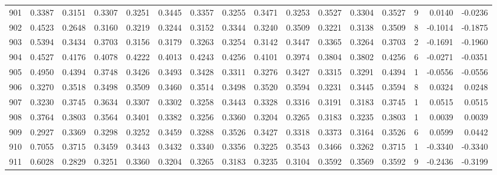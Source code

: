 \begin{tabular}{lrrrrrrrrrrrrrrr}
901 &      0.3387 &  0.3151 &  0.3307 &  0.3251 &  0.3445 &  0.3357 &  0.3255 &  0.3471 &  0.3253 &  0.3527 &   0.3304 &     0.3527 &      9 &                    0.0140 &                    -0.0236 \\
902 &      0.4523 &  0.2648 &  0.3160 &  0.3219 &  0.3244 &  0.3152 &  0.3344 &  0.3240 &  0.3509 &  0.3221 &   0.3138 &     0.3509 &      8 &                   -0.1014 &                    -0.1875 \\
903 &      0.5394 &  0.3434 &  0.3703 &  0.3156 &  0.3179 &  0.3263 &  0.3254 &  0.3142 &  0.3447 &  0.3365 &   0.3264 &     0.3703 &      2 &                   -0.1691 &                    -0.1960 \\
904 &      0.4527 &  0.4176 &  0.4078 &  0.4222 &  0.4013 &  0.4243 &  0.4256 &  0.4101 &  0.3974 &  0.3804 &   0.3802 &     0.4256 &      6 &                   -0.0271 &                    -0.0351 \\
905 &      0.4950 &  0.4394 &  0.3748 &  0.3426 &  0.3493 &  0.3428 &  0.3311 &  0.3276 &  0.3427 &  0.3315 &   0.3291 &     0.4394 &      1 &                   -0.0556 &                    -0.0556 \\
906 &      0.3270 &  0.3518 &  0.3498 &  0.3509 &  0.3460 &  0.3514 &  0.3498 &  0.3520 &  0.3594 &  0.3231 &   0.3445 &     0.3594 &      8 &                    0.0324 &                     0.0248 \\
907 &      0.3230 &  0.3745 &  0.3634 &  0.3307 &  0.3302 &  0.3258 &  0.3443 &  0.3328 &  0.3316 &  0.3191 &   0.3183 &     0.3745 &      1 &                    0.0515 &                     0.0515 \\
908 &      0.3764 &  0.3803 &  0.3564 &  0.3401 &  0.3382 &  0.3256 &  0.3360 &  0.3204 &  0.3265 &  0.3183 &   0.3235 &     0.3803 &      1 &                    0.0039 &                     0.0039 \\
909 &      0.2927 &  0.3369 &  0.3298 &  0.3252 &  0.3459 &  0.3288 &  0.3526 &  0.3427 &  0.3318 &  0.3373 &   0.3164 &     0.3526 &      6 &                    0.0599 &                     0.0442 \\
910 &      0.7055 &  0.3715 &  0.3459 &  0.3443 &  0.3432 &  0.3340 &  0.3356 &  0.3225 &  0.3543 &  0.3466 &   0.3262 &     0.3715 &      1 &                   -0.3340 &                    -0.3340 \\
911 &      0.6028 &  0.2829 &  0.3251 &  0.3360 &  0.3204 &  0.3265 &  0.3183 &  0.3235 &  0.3104 &  0.3592 &   0.3569 &     0.3592 &      9 &                   -0.2436 &                    -0.3199 \\

\end{tabular}
